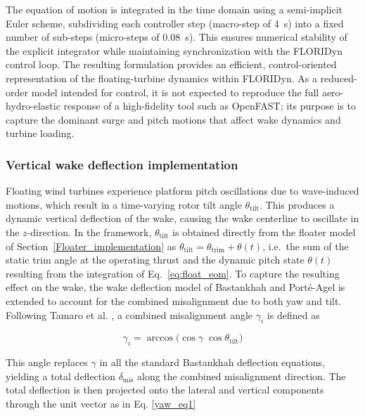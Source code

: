 \documentclass[final,5p,times,twocolumn]{elsarticle}
\begin{document}
The equation of motion is integrated in the time domain using a semi-implicit Euler scheme, subdividing each controller step (macro-step of \SI{4}{\second}) into a fixed number of sub-steps (micro-steps of \SI{0.08}{\second}). This ensures numerical stability of the explicit integrator while maintaining synchronization with the FLORIDyn control loop. The resulting formulation provides an efficient, control-oriented representation of the floating-turbine dynamics within FLORIDyn. As a reduced-order model intended for control, it is not expected to reproduce the full aero-hydro-elastic response of a high-fidelity tool such as OpenFAST; its purpose is to capture the dominant surge and pitch motions that affect wake dynamics and turbine loading.


\subsubsection{Vertical wake deflection implementation}
\label{vertical_deflection}

Floating wind turbines experience platform pitch oscillations due to wave-induced motions, which result in a time-varying rotor tilt angle $\theta_{\text{tilt}}$. This produces a dynamic vertical deflection of the wake, causing the wake centerline to oscillate in the $z$-direction. In the framework, $\theta_{\text{tilt}}$ is obtained directly from the floater model of Section~\ref{Floater_implementation} as $\theta_{\text{tilt}} = \theta_{\text{trim}} + \theta(t)$, i.e.\ the sum of the static trim angle at the operating thrust and the dynamic pitch state $\theta(t)$ resulting from the integration of Eq.~\eqref{eq:float_eom}. To capture the resulting effect on the wake, the wake deflection model of Bastankhah and Port\'{e}-Agel \cite{bastankhah2016} is extended to account for the combined misalignment due to both yaw and tilt. Following Tamaro et al. \cite{tamaro2024}, a combined misalignment angle $\gamma_i$ is defined as

\begin{equation}
    \gamma_i = \arccos\!\bigl(\cos\gamma\;\cos\theta_{\text{tilt}}\bigr)
    \label{eq:true_misalignment}
\end{equation}

\noindent This angle replaces $\gamma$ in all the standard Bastankhah deflection equations, yielding a total deflection $\delta_{\text{mis}}$ along the combined misalignment direction. The total deflection is then projected onto the lateral and vertical components through the unit vector as in Eq. \eqref{yaw_eq1}
\end{document}
